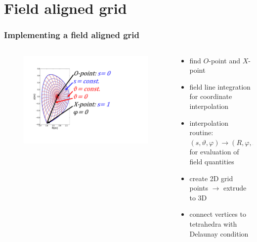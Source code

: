 \documentclass{beamer}
\begin{document}
\section{Field aligned grid}
\begin{frame}
\frametitle{Implementing a field aligned grid}
\vspace{-0 cm}
\begin{columns}[onlytextwidth]
	\begin{column}{0.5\textwidth}
			\vspace{-1 cm}
		\begin{center}
			\begin{figure}
				\includegraphics[trim={2cm 3cm 6cm 2cm},clip,width=1.1\textwidth]{FIGURES/SFC_pdf2.pdf}
			\end{figure}
		\end{center}
	\end{column}
	\begin{column}{0.5\textwidth}
		\vspace{-1.5 cm}
		\begin{center}
			\begin{itemize}
				\item find $O$-point and $X$-point
				\item field line integration for coordinate interpolation
				\item interpolation routine: $(s,\vartheta,\varphi)\rightarrow (R,\varphi,Z)$ for evaluation of field quantities
				\item create 2D grid points \newline $\rightarrow$ extrude to 3D
				\item connect vertices to tetrahedra with Delaunay condition
			\end{itemize}
		\end{center}
	\end{column}
\end{columns}
\end{frame}
\end{document}
